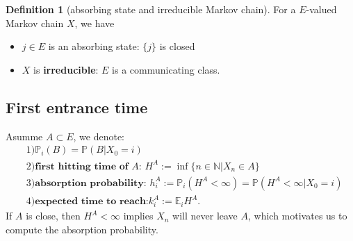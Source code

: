\documentclass[a4paper,11pt]{book}
\theoremstyle{definition}
\newtheorem{definition}{Definition}[section]
\theoremstyle{remark}
\begin{document}
\begin{definition}[absorbing state and irreducible Markov chain]
	For a $E$-valued Markov chain $X$, we have
	\begin{itemize}
		\item $j \in E$ is an absorbing state: $\{j\}$ is closed
		\item $X$ is \textbf{irreducible}: $E$ is a communicating class.
	\end{itemize}
\end{definition}


\subsection{First entrance time}
Asumme $A \subset E$, we denote:
\begin{align*}
	&1)\mathbb{P}_i(B) = \mathbb{P}(B|X_0 = i)\\
	&2)\textbf{first hitting time of $A$: } H^A:= \inf \{ n \in \mathbb{N}| X_n \in A\} \\
	&3)\textbf{absorption probability: }h_i^A:= \mathbb{P}_i(H^A < \infty) = \mathbb{P}(H^A < \infty |X_0 = i)\\
	&4)\textbf{expected time to reach:} k_i^A:= \mathbb{E}_i H^A.
\end{align*}
If $A$ is close, then $H^A < \infty$ implies $X_n$ will never leave $A$, which motivates us to compute the absorption probability. \\
\end{document}
